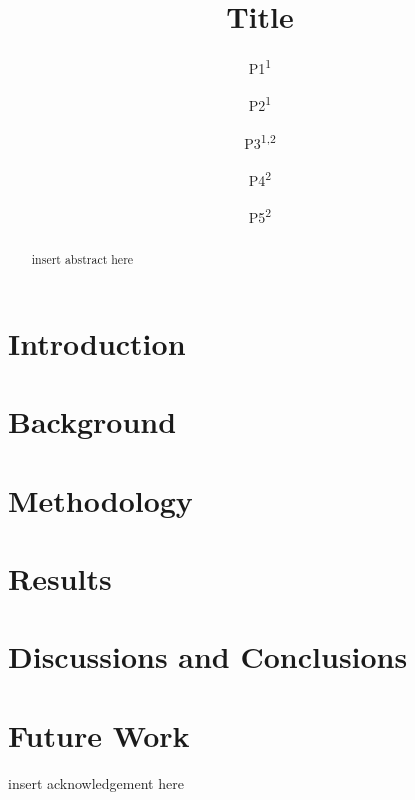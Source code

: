 \documentclass[smallextended]{svjour3}
\newcommand\copyrighttext{%
\small This is the author's version of an article published in ....
The final authenticated version is available online at: \url{...}.}
\newcommand\copyrightnotice{%
\begin{tikzpicture}[remember picture,overlay]
\node[anchor=north,yshift=-30pt] at (current page.north) {\fbox{\parbox{\textwidth}{\copyrighttext}}};
\end{tikzpicture}
}
\begin{document}

\def\makeheadbox{\relax}


\title{{\sffamily Title}}


\author{\sffamily \large 
        P1\textsuperscript{1} \and
        P2\textsuperscript{1} \and 
        P3\textsuperscript{1,2} \and 
        P4\textsuperscript{2} \and 
        P5\textsuperscript{2}
}



\date{}

\maketitle           


\vspace{-2cm}
\begin{abstract}
insert abstract here   
\end{abstract}

\section{Introduction}


\section{Background}\label{sec-background}
\section{Methodology}\label{sec-methodology}
\section{Results}\label{sec-results}
\section{Discussions and Conclusions}\label{sec-conclusion}

\section{Future Work}\label{sec-future}

\begin{acknowledgements}
insert acknowledgement here
\end{acknowledgements}

\newpage

\end{document}
